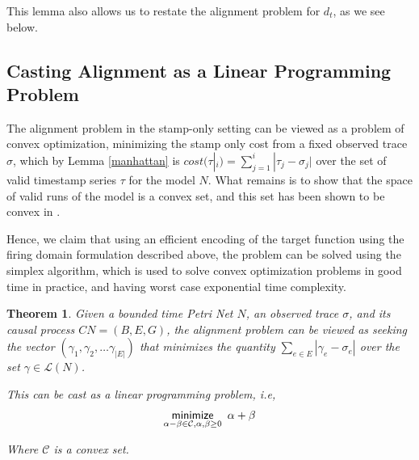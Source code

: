 \documentclass[conference]{IEEEtran}
\newtheorem{theorem}{Theorem}
\begin{document}
	
	This lemma also allows us to restate the alignment problem for $d_t$, as we see below. 
	
	\subsection{Casting Alignment as a Linear Programming Problem}
	The alignment problem in the stamp-only setting can be viewed as a problem of convex optimization, minimizing the stamp only cost from a fixed observed trace $\sigma$, which by Lemma \ref{manhattan} is $cost(\tau|_i) = \sum_{j = 1}^{i} |\tau_j - \sigma_j|$ over the set of valid timestamp series $\tau$ for the model $N$. 
	What remains is to show that the space of valid runs of the model is a convex set, and this set has been shown to be convex in \cite{BM82}. 
	
	Hence, we claim that using an efficient encoding of the target function using the firing domain formulation described above, the problem can be solved using the simplex algorithm, which is used to solve convex optimization problems in good time in practice, and having worst case exponential time complexity. 
	
	\begin{theorem}\label{convexset}
		Given a bounded time Petri Net $N$, an observed trace $\sigma$, and its causal process $CN = (B, E, G)$, the alignment problem can be viewed as seeking the vector $(\gamma_1, \gamma_2, \dots \gamma_{|E|})$ that minimizes the quantity $\sum_{e \in E} |\gamma_e - \sigma_e|$ over the set $\gamma \in \mathcal{L}(N)$. 
		
		This can be cast as a linear programming problem, i.e, $$\underset{\alpha - \beta \in \mathcal{C}, \alpha, \beta \geq 0}{\mathsf{minimize}} \hspace{0.5em} \alpha + \beta  $$
		
		Where $\mathcal{C}$ is a convex set. 
	\end{theorem}
	
\end{document}
